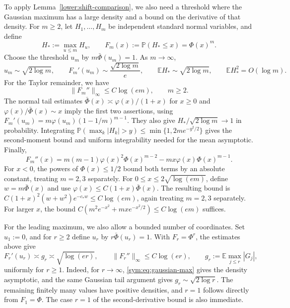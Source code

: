 \documentclass[11pt,letterpaper]{article}
\newcommand{\vSix}[1]{{\color{magenta}#1}}
\newenvironment{vSixBlock}{\color{magenta}}{}
\theoremstyle{remark}
\newcommand{\E}{\mathbb E}
\newcommand{\Pp}{\mathbb P}
\begin{document}
To apply Lemma~\ref{lower:shift-comparison}, we also need a threshold
where the Gaussian maximum has a large density and a bound on the
derivative of that density. \vSix{For \(m\ge2\), let} \(H_1,\ldots,H_m\) be independent
standard normal variables, and define
\[
 H_*:=\max_{u\le m}H_u,\qquad F_m(x):=\Pp(H_*\le x)=\Phi(x)^m.
\]
Choose the threshold \(u_m\) by \(m\bar\Phi(u_m)=1\).
As \(m\to\infty\),
\begin{equation}
 u_m\sim\sqrt{2\log m},\qquad
 F_m'(u_m)\sim\frac{\sqrt{2\log m}}e,\qquad
 \E H_*\sim\sqrt{2\log m},\qquad \E H_*^2=O(\log m).
 \label{sym:eq:gaussian-max}
\end{equation}
For the Taylor remainder, we have
\begin{equation}
 \|F_m''\|_\infty\le C\log(em),\qquad m\ge2.
 \label{sym:eq:gaussian-smoothness}
\end{equation}
The normal tail estimates
\(\bar\Phi(x)\asymp\varphi(x)/(1+x)\) for \(x\ge0\) and
\(\varphi(x)/\bar\Phi(x)\sim x\) imply the first two assertions,
using \(F_m'(u_m)=m\varphi(u_m)(1-1/m)^{m-1}\).
They also give \(H_*/\sqrt{2\log m}\to1\) in probability.
Integrating \(\Pp(\max_k|H_k|>y)\le\min\{1,2me^{-y^2/2}\}\)
gives the second-moment bound and uniform integrability needed for
the mean asymptotic. Finally,
\[
 F_m''(x)=m(m-1)\varphi(x)^2\Phi(x)^{m-2}
             -mx\varphi(x)\Phi(x)^{m-1}.
\]
For \(x<0\), the powers of \(\Phi(x)\le1/2\) bound both terms
by an absolute constant, treating \(m=2,3\) separately. For
\(0\le x\le2\sqrt{\log(em)}\), {define} \(w=m\bar\Phi(x)\) and use
\(\varphi(x)\le C(1+x)\bar\Phi(x)\). The resulting bound is
\(C(1+x)^2(w+w^2)e^{-c_*w}\le C\log(em)\), again treating
\(m=2,3\) separately. For larger \(x\), the bound
\(C(m^2e^{-x^2}+mx e^{-x^2/2})\le C\log(em)\) suffices.


\begin{vSixBlock}
For the leading maximum, we also allow a bounded number of coordinates.
Set \(u_1:=0\), and for \(r\ge2\) define \(u_r\) by
\(r\bar\Phi(u_r)=1\). With \(F_r=\Phi^r\), the estimates above give
\begin{equation}
 F_r'(u_r)\asymp g_r\asymp\sqrt{\log(er)},\qquad
 \|F_r''\|_\infty\le C\log(er),\qquad
 g_r:=\E\max_{j\le r}|G_j|,
 \label{lower:eq:leading-density}
\end{equation}
uniformly for \(r\ge1\). Indeed, for \(r\to\infty\),
\eqref{sym:eq:gaussian-max} gives the density asymptotic, and the
same Gaussian tail argument gives \(g_r\sim\sqrt{2\log r}\).
The remaining finitely many values have positive densities, and
\(r=1\) follows directly from \(F_1=\Phi\). The case \(r=1\)
of the second-derivative bound is also immediate.
\end{vSixBlock}
\end{document}
